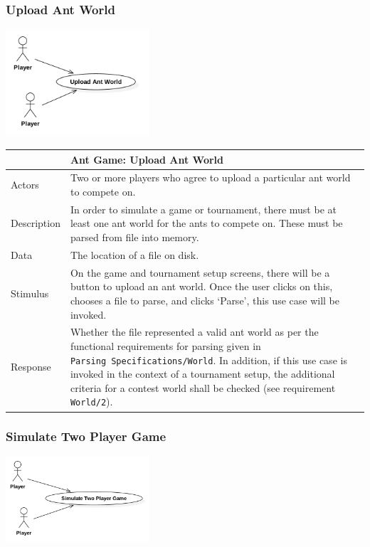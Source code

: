 \documentclass[11pt]{article}
\begin{document}
\subsubsection{Upload Ant World}\label{upload-ant-world}

\begin{center}
\includegraphics[width=0.4\textwidth]{high-level-diagrams/use-case-3-upload-ant-world.png}
\end{center}

\begin{longtable}[c]{@{}p{}p{}@{}}
\toprule
& Ant Game: Upload Ant World\tabularnewline
\midrule

Actors & Two or more players who agree to upload a particular ant world
to compete on.\tabularnewline
Description & In order to simulate a game or tournament, there must be
at least one ant world for the ants to compete on. These must be parsed
from file into memory.\tabularnewline
Data & The location of a file on disk.\tabularnewline
Stimulus & On the game and tournament setup screens, there will be a
button to upload an ant world. Once the user clicks on this, chooses a
file to parse, and clicks `Parse', this use case will be
invoked.\tabularnewline
Response & Whether the file represented a valid ant world as per the
functional requirements for parsing given in
\texttt{Parsing\ Specifications/World}. In addition, if this use case is
invoked in the context of a tournament setup, the additional criteria
for a contest world shall be checked (see requirement
\texttt{World/2}).\tabularnewline
\bottomrule
\end{longtable}

\subsubsection{Simulate Two Player Game}\label{simulate-two-player-game}

\begin{center}
\includegraphics[width=0.4\textwidth]{high-level-diagrams/use-case-4-two-player-game.png}
\end{center}
\end{document}
